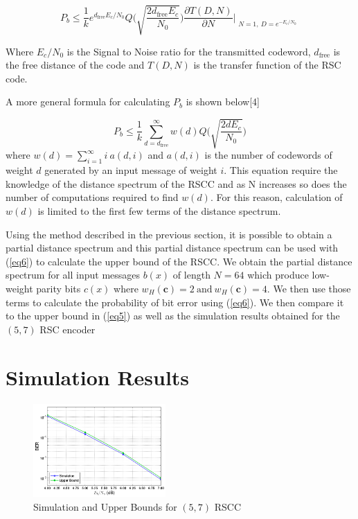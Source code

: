 \documentclass[twocolumn]{article}
\begin{document}
\begin{equation}
P_b \leq  \frac{1}{k} e^{d_{\text{free}}E_c/N_0}Q\Bigg( \sqrt{\frac{2d_{\text{free}}E_c}{N_0}}\Bigg) \frac{\partial T(D,N)}{\partial N}\Bigr|_{\substack{N=1,~D=e^{-E_c/N_0}}}
\label{eq5}
\end{equation}

Where $E_c/N_0$ is the Signal to Noise ratio for the transmitted codeword, $d_{\text{free}}$ is the free distance of the code and $T(D,N)$ is the transfer function of the RSC code.

A more general formula for calculating $P_b$ is shown below[4]

\begin{equation}
P_b \leq \frac{1}{k} \sum_{d=d_{\text{free}}}^{\infty} w(d) Q\Bigg( \sqrt{\frac{2dE_c}{N_0}}\Bigg)
\label{eq6}
\end{equation}
where $w(d)=\sum_{i=1}^{\infty} i~ a(d,i)$ and $ a(d,i)$ is the number of codewords of weight $d$ generated by an input message of weight $i$. This equation require the knowledge of the distance spectrum of the RSCC and as N increases so does the number of computations required to find $w(d)$. For this reason, calculation of $w(d)$ is limited to the first few terms of the distance spectrum. 

Using the method described in the previous section, it is possible to obtain a partial distance spectrum and this partial distance spectrum can be used with (\ref{eq6}) to calculate the upper bound of the RSCC. We obtain the partial distance spectrum for all input messages $b(x)$ of length $N=64$ which produce low-weight parity bits
$c(x)$ where $w_H(\textbf{c})=2 ~\text{and} ~ w_H(\textbf{c})=4$. We then use those terms to calculate the probability of bit error using (\ref{eq6}). We then compare it to the upper bound in (\ref{eq5}) as well as the simulation results obtained for the $(5,7)$ RSC encoder
\section{Simulation Results}
\label{sec5}

\begin{figure}[h]
\centering
		\includegraphics[width=0.45\textwidth]{paperg2.png}
		\caption{Simulation and Upper Bounds for $(5,7)$ RSCC}
		\label{fig3}
		\end{figure}
		
\end{document}
